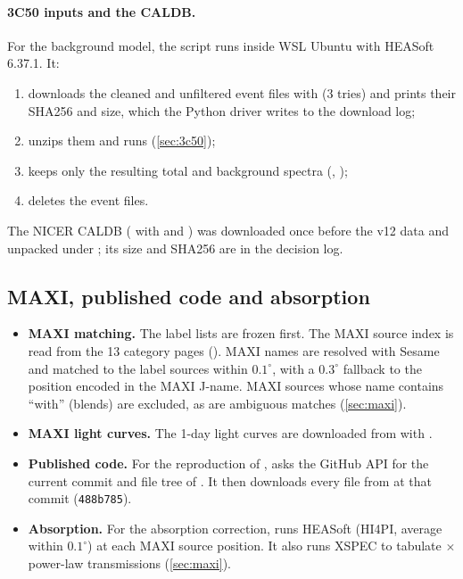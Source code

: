 \paragraph{3C50 inputs and the CALDB.} For the background model, the script  runs inside WSL Ubuntu
with HEASoft 6.37.1. It:
\begin{enumerate}
\item downloads the cleaned and unfiltered event files with  (3 tries) and prints their SHA256 and size, which
the Python driver writes to the download log;
\item unzips them and runs  (\cref{sec:3c50});
\item keeps only the resulting total and background spectra (, );
\item deletes the event files.
\end{enumerate}
The NICER CALDB ( with  and ) was downloaded
once before the v12 data and unpacked under ; its size and SHA256 are in the decision log.

\subsection{MAXI, published code and absorption}\label{sec:get-maxi}
\begin{itemize}
\item \textbf{MAXI matching.} The label lists are frozen first. The MAXI source index is read from the 13 category pages
(). MAXI names are resolved with Sesame and matched to the label sources within
$0.1^\circ$, with a $0.3^\circ$ fallback to the position encoded in the MAXI J-name. MAXI sources whose name contains
``with'' (blends) are excluded, as are ambiguous matches (\cref{sec:maxi}).
\item \textbf{MAXI light curves.} The 1-day light curves are downloaded from
 with .
\item \textbf{Published code.} For the reproduction of \citet{deBeurs2022},  asks the GitHub API
for the current commit and file tree of . It then downloads every file
from  at that commit (\texttt{488b785}).
\item \textbf{Absorption.} For the absorption correction,  runs HEASoft  (HI4PI, average
within $0.1^\circ$) at each MAXI source position. It also runs XSPEC to tabulate $\times$power-law
transmissions (\cref{sec:maxi}).
\end{itemize}

